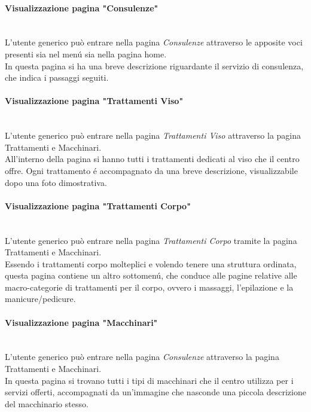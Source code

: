 \documentclass[]{article}
\begin{document}
\paragraph{Visualizzazione pagina "Consulenze"}\mbox{}\\
L'utente generico può entrare nella pagina \textit{Consulenze} attraverso le apposite voci presenti sia nel menú sia nella pagina home.\\
In questa pagina si ha una breve descrizione riguardante il servizio di consulenza, che indica i passaggi seguiti.

\paragraph{Visualizzazione pagina "Trattamenti Viso"}\mbox{}\\
L'utente generico può entrare nella pagina \textit{Trattamenti Viso} attraverso la pagina Trattamenti e Macchinari.\\
All'interno della pagina si hanno tutti i trattamenti dedicati al viso che il centro offre. Ogni trattamento é accompagnato da una breve descrizione, visualizzabile dopo una foto dimostrativa.

\paragraph{Visualizzazione pagina "Trattamenti Corpo"}\mbox{}\\
L'utente generico può entrare nella pagina \textit{Trattamenti Corpo} tramite la pagina Trattamenti e Macchinari.\\
Essendo i trattamenti corpo molteplici e volendo tenere una struttura ordinata, questa pagina contiene un altro sottomenú, che conduce alle pagine relative alle macro-categorie di trattamenti per il corpo, ovvero i massaggi, l'epilazione e la manicure/pedicure.

\paragraph{Visualizzazione pagina "Macchinari"}\mbox{}\\
L'utente generico può entrare nella pagina \textit{Consulenze} attraverso la pagina Trattamenti e Macchinari.\\
In questa pagina si trovano tutti i tipi di macchinari che il centro utilizza per i servizi offerti, accompagnati da un'immagine che nasconde una piccola descrizione del macchinario stesso.
\end{document}
